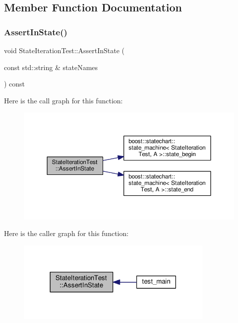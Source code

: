 \subsection{Member Function Documentation}
\mbox{\label{struct_state_iteration_test_a4277e169f872f9e9ba4d1d933ab32722}} 
\subsubsection{\texorpdfstring{Assert\+In\+State()}{AssertInState()}}
{\footnotesize\ttfamily void State\+Iteration\+Test\+::\+Assert\+In\+State (\begin{DoxyParamCaption}\item[{const std\+::string \&}]{state\+Names }\end{DoxyParamCaption}) const\hspace{0.3cm}{\ttfamily [inline]}}

Here is the call graph for this function\+:
\nopagebreak
\begin{figure}[H]
\begin{center}
\leavevmode
\includegraphics[width=350pt]{struct_state_iteration_test_a4277e169f872f9e9ba4d1d933ab32722_cgraph}
\end{center}
\end{figure}
Here is the caller graph for this function\+:
\nopagebreak
\begin{figure}[H]
\begin{center}
\leavevmode
\includegraphics[width=270pt]{struct_state_iteration_test_a4277e169f872f9e9ba4d1d933ab32722_icgraph}
\end{center}
\end{figure}


